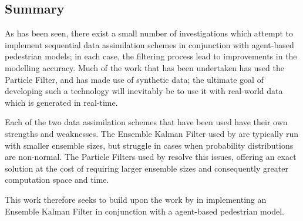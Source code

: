 \subsection{Summary}\label{sub:lit_rev:summary}



As has been seen, there exist a small number of investigations which attempt to
implement sequential data assimilation schemes in conjunction with agent-based
pedestrian models; in each case, the filtering process lead to improvements in
the modelling accuracy.
Much of the work that has been undertaken has used the Particle Filter, and has
made use of synthetic data; the ultimate goal of developing such a technology
will inevitably be to use it with real-world data which is generated in
real-time.

Each of the two data assimilation schemes that have been used have their own
strengths and weaknesses.
The Ensemble Kalman Filter used by \citet{ward2016dynamic} are typically run
with smaller ensemble sizes, but struggle in cases when probability
distributions are non-normal. 
The Particle Filters used by \citet{wang2013data, rai2013behavior,
wang2015data} resolve this issues, offering an exact solution at the cost of
requiring larger ensemble sizes and consequently greater computation space and
time.

This work therefore seeks to build upon the work by \citet{ward2016dynamic} in
implementing an Ensemble Kalman Filter in conjunction with a agent-based
pedestrian model.

\newpage
